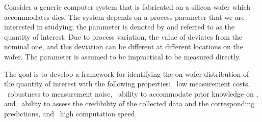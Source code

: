 Consider a generic computer system that is fabricated on a silicon wafer which
accommodates \nd dies. The system depends on a process parameter that we are
interested in studying; the parameter is denoted by \g and referred to as the
quantity of interest. Due to process variation, the value of \g deviates from
the nominal one, and this deviation can be different at different locations on
the wafer. The parameter is assumed to be impractical to be measured directly.

The goal is to develop a framework for identifying the on-wafer distribution of
the quantity of interest \g with the following properties: \one~low measurement
costs, \two~robustness to measurement noise, \three~ability to accommodate prior
knowledge on \g, and \four~ability to assess the credibility of the collected
data and the corresponding predictions, and \five~high computation speed.
